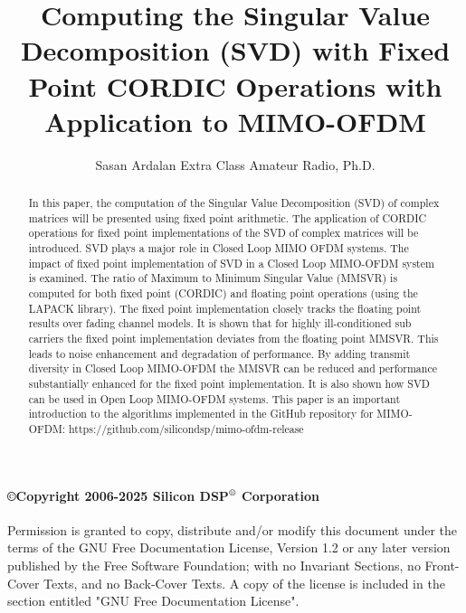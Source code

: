           








\title {Computing the Singular Value Decomposition (SVD) with Fixed Point CORDIC Operations with  Application to MIMO-OFDM }
\author{Sasan Ardalan Extra Class Amateur Radio, Ph.D.}
\date{}



\maketitle
\thispagestyle{empty}
\begin{abstract}
In this paper, the computation of the Singular Value Decomposition (SVD) of complex matrices will be presented using fixed point arithmetic. The application of CORDIC operations for fixed point implementations of the SVD of complex matrices will be introduced. SVD plays a major role in Closed Loop MIMO OFDM systems. The impact of fixed point implementation of SVD in a Closed Loop MIMO-OFDM system is examined. The ratio of Maximum to Minimum Singular Value (MMSVR) is computed for both fixed point (CORDIC) and floating point operations (using the LAPACK library). The fixed point implementation closely tracks the floating point results over fading channel models. It is shown that for highly ill-conditioned sub carriers the fixed point implementation deviates from the floating point MMSVR. This leads to noise enhancement and degradation of performance. By adding transmit diversity in Closed Loop MIMO-OFDM the MMSVR can be reduced and performance substantially enhanced for the fixed point implementation. It is also shown how SVD can be used in Open Loop MIMO-OFDM systems. This paper is an important introduction to the algorithms implemented in the GitHub repository for MIMO-OFDM:
https://github.com/silicondsp/mimo-ofdm-release
\end{abstract}
\paragraph{\copyright{Copyright  2006-2025  Silicon DSP$\textsuperscript{\textregistered}$ Corporation}}
Permission is granted to copy, distribute and/or modify this
document under the terms of the GNU Free Documentation License,
Version 1.2 or any later version published by the Free Software
Foundation; with no Invariant Sections, no Front-Cover Texts, and
no Back-Cover Texts. A copy of the license is included in the
section entitled "GNU Free Documentation License".


